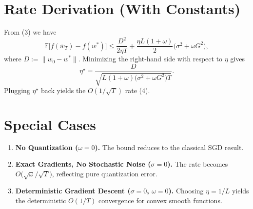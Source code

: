 \documentclass{article}
\newcommand{\E}{\mathbb{E}}
\begin{document}
\section*{Rate Derivation (With Constants)}
From (3) we have
\[
\E\!\big[f(\bar w_T)-f(w^{*})\big]
\le \frac{D^{2}}{2\eta T}
   +\frac{\eta L(1+\omega)}{2}\big(\sigma^{2}+\omega G^{2}\big),
\]
where $D:=\|w_{0}-w^{*}\|$. Minimizing the right‑hand side with respect to $\eta$ gives
\[
\eta^{\star}= \frac{D}{\sqrt{L(1+\omega)\big(\sigma^{2}+\omega G^{2}\big)T}}.
\]
Plugging $\eta^{\star}$ back yields the $O(1/\sqrt{T})$ rate (4).

\section*{Special Cases}
\begin{enumerate}
\item \textbf{No Quantization ($\omega=0$).} The bound reduces to the classical SGD result.
\item \textbf{Exact Gradients, No Stochastic Noise ($\sigma=0$).} The rate becomes $O\!\big(\sqrt{\omega}/\sqrt{T}\big)$, reflecting pure quantization error.
\item \textbf{Deterministic Gradient Descent ($\sigma=0$, $\omega=0$).} Choosing $\eta=1/L$ yields the deterministic $O(1/T)$ convergence for convex smooth functions.
\end{enumerate}
\end{document}
